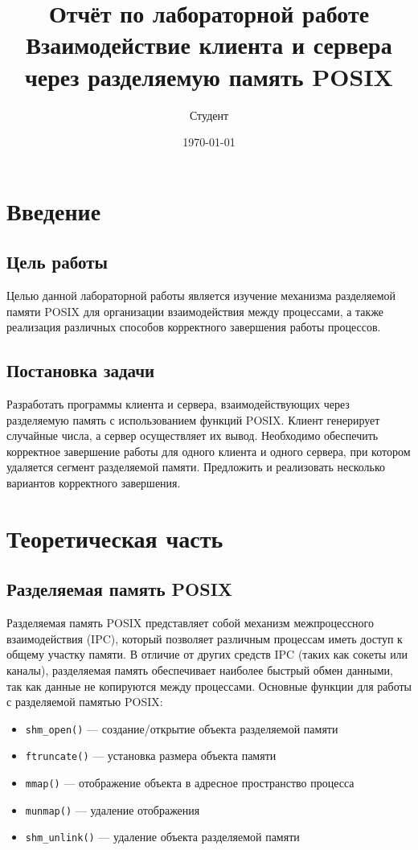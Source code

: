 \documentclass[a4paper,12pt]{article}
\title{Отчёт по лабораторной работе\\
\large{Взаимодействие клиента и сервера через разделяемую память POSIX}}
\author{Студент}
\date{\today}
\begin{document}
\maketitle
\tableofcontents
\newpage
\section{Введение}
\subsection{Цель работы}
Целью данной лабораторной работы является изучение механизма разделяемой памяти POSIX для организации взаимодействия между процессами, а также реализация различных способов корректного завершения работы процессов.
\subsection{Постановка задачи}
Разработать программы клиента и сервера, взаимодействующих через разделяемую память с использованием функций POSIX. Клиент генерирует случайные числа, а сервер осуществляет их вывод. Необходимо обеспечить корректное завершение работы для одного клиента и одного сервера, при котором удаляется сегмент разделяемой памяти. Предложить и реализовать несколько вариантов корректного завершения.
\section{Теоретическая часть}
\subsection{Разделяемая память POSIX}
Разделяемая память POSIX представляет собой механизм межпроцессного взаимодействия (IPC), который позволяет различным процессам иметь доступ к общему участку памяти. В отличие от других средств IPC (таких как сокеты или каналы), разделяемая память обеспечивает наиболее быстрый обмен данными, так как данные не копируются между процессами.
Основные функции для работы с разделяемой памятью POSIX:
\begin{itemize}
    \item \texttt{shm\_open()} — создание/открытие объекта разделяемой памяти
    \item \texttt{ftruncate()} — установка размера объекта памяти
    \item \texttt{mmap()} — отображение объекта в адресное пространство процесса
    \item \texttt{munmap()} — удаление отображения
    \item \texttt{shm\_unlink()} — удаление объекта разделяемой памяти
\end{itemize}
\end{document}
